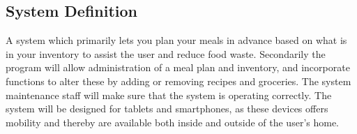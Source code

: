 \subsection{System Definition}
A system which primarily lets you plan your meals in advance based on what is in your inventory to assist the user and reduce food waste.
Secondarily the program will allow administration of a meal plan and inventory, and incorporate functions to alter these by adding or removing recipes and groceries. The system maintenance staff will make sure that the system is operating correctly.
The system will be designed for tablets and smartphones, as these devices offers mobility and thereby are available both inside and outside of the user's home.